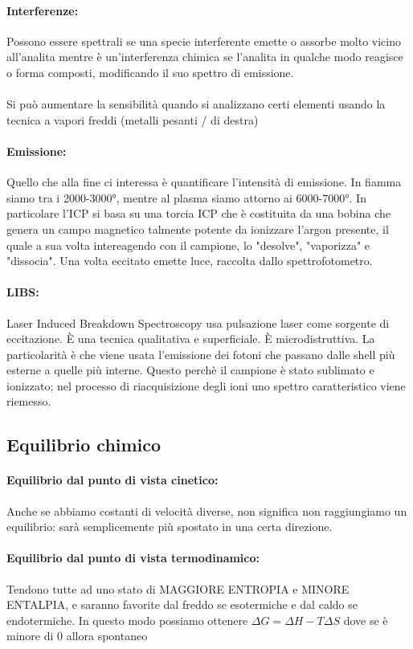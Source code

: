 \documentclass{article}
\begin{document}
\paragraph{Interferenze: } Possono essere spettrali se una specie interferente emette o assorbe molto vicino all'analita mentre è un'interferenza chimica se l'analita in qualche modo reagisce o forma composti, modificando il suo spettro di emissione.
\\\\
Si può aumentare la sensibilità quando si analizzano certi elementi usando la tecnica a vapori freddi (metalli pesanti / di destra)

\paragraph{Emissione: } Quello che alla fine ci interessa è quantificare l'intensità di emissione. In fiamma siamo tra i 2000-3000°, mentre al plasma siamo attorno ai 6000-7000°. In particolare l'ICP si basa su una torcia ICP che è costituita da una bobina che genera un campo magnetico talmente potente da ionizzare l'argon presente, il quale a sua volta intereagendo con il campione, lo "desolve", "vaporizza" e "dissocia". Una volta eccitato emette luce, raccolta dallo spettrofotometro.
\\
\paragraph{LIBS: } Laser Induced Breakdown Spectroscopy usa pulsazione laser come sorgente di eccitazione. È una tecnica qualitativa e superficiale. È microdistruttiva.
La particolarità è che viene usata l'emissione dei fotoni che passano dalle shell più esterne a quelle più interne. Questo perchè il campione è stato sublimato e ionizzato; nel processo di riacquisizione degli ioni uno spettro caratteristico viene riemesso.

\subsection{Equilibrio chimico}
\paragraph{Equilibrio dal punto di vista cinetico:} Anche se abbiamo costanti di velocità diverse, non significa non raggiungiamo un equilibrio: sarà semplicemente più spostato in una certa direzione. 
\paragraph{Equilibrio dal punto di vista termodinamico:} Tendono tutte ad uno stato di MAGGIORE ENTROPIA e MINORE ENTALPIA, e saranno favorite dal freddo se esotermiche e dal caldo se endotermiche. In questo modo possiamo ottenere $\Delta G = \Delta H - T\Delta S$ dove se è minore di 0 allora spontaneo
\end{document}
